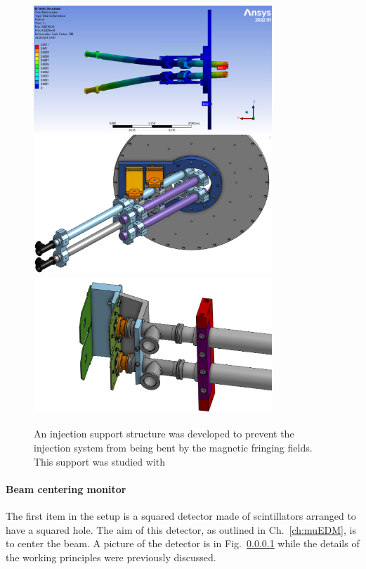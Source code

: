 \begin{refsection}
        \begin{figure}
            \centering
            \includegraphics[width=0.8\textwidth]{Figures/muEDM_Dec2023/muEDM2023_injection_ANSYS.png}
            \includegraphics[width=0.8\textwidth]{Figures/muEDM_Dec2023/muEDM2023_injection_CAD.png}
            \includegraphics[width=0.8\textwidth]{Figures/muEDM_Dec2023/TOF_Setup.png}
            \caption[muEDM 2023: Injection support structure.]{An injection support structure was developed to prevent the injection system from being bent by the magnetic fringing fields. This support was studied with \ansys}
            \label{fig:muEDM:bt2023:injectionCAD}
        \end{figure}
        
        \paragraph{Beam centering monitor}
        The first item in the setup is a squared detector made of scintillators arranged to have a squared hole.
        The aim of this detector, as outlined in Ch.~\ref{ch:muEDM}, is to center the beam.
        A picture of the detector is in Fig.~\ref{} while the details of the working principles were previously discussed.
        

\end{refsection}
